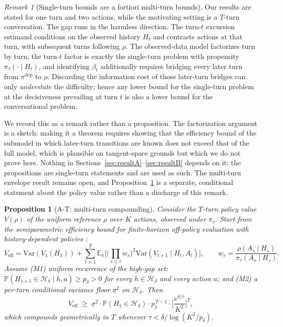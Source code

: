 \documentclass[11pt]{article}
\newtheorem{proposition}{Proposition}
\theoremstyle{definition}
\theoremstyle{remark}
\newtheorem{remark}{Remark}
\newcommand{\E}{\mathbb{E}}
\newcommand{\Prob}{\mathbb{P}}
\newcommand{\Var}{\mathrm{Var}}
\newcommand{\Hd}{\mathcal{H}_{\delta}}
\begin{document}
\begin{remark}[Single-turn bounds are a fortiori multi-turn
bounds]\label{rem:aprime}
Our results are stated for one turn and two actions, while the motivating
setting is a $T$-turn conversation. The gap runs in the harmless direction.
The turn-$t$ excursion estimand conditions on the observed history $H_t$ and
contrasts actions at that turn, with subsequent turns following $\rho$. The
observed-data model factorizes turn by turn; the turn-$t$ factor is exactly
the single-turn problem with propensity $\pi_\tau(\cdot \mid H_t)$, and
identifying $\beta_t$ additionally requires bridging every later turn from
$\pi^{\mathrm{dep}}$ to $\rho$. Discarding the information cost of those
later-turn bridges can only \emph{understate} the difficulty; hence any lower
bound for the single-turn problem at the decisiveness prevailing at turn $t$
is also a lower bound for the conversational problem.

We record this as a remark rather than a proposition. The factorization
argument is a sketch: making it a theorem requires showing that the
efficiency bound of the submodel in which later-turn transitions are known
does not exceed that of the full model, which is plausible on tangent-space
grounds but which we do not prove here. Nothing in
Sections~\ref{sec:resultA}--\ref{sec:resultB} depends on it; the
propositions are single-turn statements and are used as such. The
multi-turn envelope result remains open, and
Proposition~\ref{prop:at} is a separate, conditional statement about the
policy value rather than a discharge of this remark.
\end{remark}

\begin{proposition}[A-T: multi-turn compounding]\label{prop:at}
Consider the $T$-turn policy value $V(\rho)$ of the uniform reference $\rho$
over $K$ actions, observed under $\pi_\tau$. Start from the semiparametric
efficiency bound for finite-horizon off-policy evaluation with
history-dependent policies \citep{kallus2020double,jiang2016doubly}:
\[
V_{\mathrm{eff}} = \Var(V_1(H_1)) + \sum_{t=1}^{T}
\E_\pi\!\Big[\Big(\textstyle\prod_{s\leq t} w_s\Big)^{2}
\Var(V_{t+1} \mid H_t, A_t)\Big],
\qquad w_s = \frac{\rho(A_s \mid H_s)}{\pi_\tau(A_s \mid H_s)}.
\]
Assume (M1) \emph{uniform recurrence of the high-gap set}: $\Prob(H_{s+1} \in
\Hd \mid h, a) \geq p_\delta > 0$ for every $h \in \Hd$ and every action $a$;
and (M2) a per-turn conditional variance floor $\underline{\sigma}^2$ on
$\Hd$. Then
\[
V_{\mathrm{eff}} \;\geq\; \underline{\sigma}^2 \cdot \Prob(H_1 \in \Hd)
\cdot p_\delta^{\,T-1} \cdot \Big[\frac{e^{\delta/\tau}}{K^{2}}\Big]^{T},
\]
which compounds geometrically in $T$ whenever $\tau <
\delta/\log(K^{2}/p_\delta)$.
\end{proposition}
\end{document}
